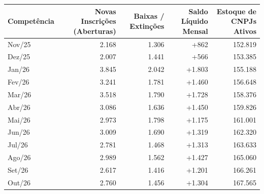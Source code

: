 \documentclass[10pt,a4paper]{article}
\begin{document}
\par\vspace{0.08cm}
\noindent\begin{minipage}{\linewidth}
  \par\vspace{2pt}
  {\fontsize{7.0}{8.6}\selectfont\setlength{\tabcolsep}{4.5pt}%
\begin{tabularx}{\linewidth}{>{\raggedright\arraybackslash}Xrrrr}
\toprule
\rowcolor{corprimaria} \textbf{\color{white}Competência} & \textbf{\color{white}Novas Inscrições (Aberturas)} & \textbf{\color{white}Baixas / Extinções} & \textbf{\color{white}Saldo Líquido Mensal} & \textbf{\color{white}Estoque de CNPJs Ativos} \\
\midrule
Nov/25 & 2.168 & 1.306 & +862 & 152.819 \\
\rowcolor{corfundo} Dez/25 & 2.007 & 1.441 & +566 & 153.385 \\
Jan/26 & 3.845 & 2.042 & +1.803 & 155.188 \\
\rowcolor{corfundo} Fev/26 & 3.241 & 1.781 & +1.460 & 156.648 \\
Mar/26 & 3.518 & 1.790 & +1.728 & 158.376 \\
\rowcolor{corfundo} Abr/26 & 3.086 & 1.636 & +1.450 & 159.826 \\
Mai/26 & 2.973 & 1.798 & +1.175 & 161.001 \\
\rowcolor{corfundo} Jun/26 & 3.009 & 1.690 & +1.319 & 162.320 \\
Jul/26 & 2.781 & 1.468 & +1.313 & 163.633 \\
\rowcolor{corfundo} Ago/26 & 2.989 & 1.562 & +1.427 & 165.060 \\
Set/26 & 2.617 & 1.416 & +1.201 & 166.261 \\
\rowcolor{corfundo} Out/26 & 2.760 & 1.456 & +1.304 & 167.565 \\
\bottomrule
\end{tabularx}%
}
  \par{}
\end{minipage}
\par\vspace{0.08cm}
\end{document}
